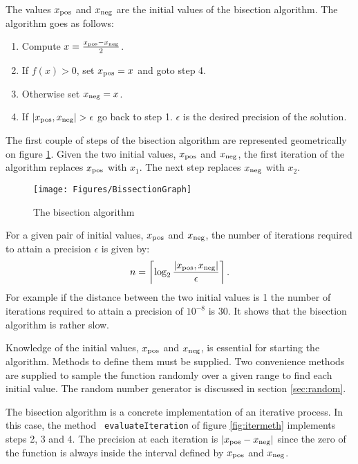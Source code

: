 \documentclass[twoside]{book}
\begin{document}
The values $x_{\mathop{\rm pos}}$ and $x_{\mathop{\rm neg}}$ are
the initial values of the bisection algorithm. The algorithm goes
as follows:
\begin{enumerate}
  \item Compute $x={x_{\mathop{\rm pos}}-x_{\mathop{\rm neg}}\over
  2}$.
  \item If $f\left(x\right)>0$, set $x_{\mathop{\rm pos}}=x$ and
  goto step 4.
  \item Otherwise set $x_{\mathop{\rm neg}}=x$.
  \item If $\left|
x_{\mathop{\rm pos}},x_{\mathop{\rm neg}}\right|>\epsilon$ go back
to step 1. $\epsilon$ is the desired precision of the solution.
\end{enumerate}
The first couple of steps of the bisection algorithm are
represented geometrically on figure \ref{fig:bisection}. Given the
two initial values, $x_{\mathop{\rm pos}}$ and $x_{\mathop{\rm
neg}}$, the first iteration of the algorithm replaces
$x_{\mathop{\rm pos}}$ with $x_1$. The next step replaces
$x_{\mathop{\rm neg}}$ with $x_2$.
\begin{figure}
\centering\texttt{[image: Figures/BissectionGraph]}
\caption{The bisection algorithm}\label{fig:bisection}
\end{figure}

For a given pair of initial values, $x_{\mathop{\rm pos}}$ and
$x_{\mathop{\rm neg}}$, the number of iterations required to
attain a precision $\epsilon$ is given by:
\begin{equation}
\label{eq:bissectime}
  n=\left\lceil\log_2{\displaystyle\left|
x_{\mathop{\rm pos}},x_{\mathop{\rm neg}}\right| \over
\displaystyle\epsilon}\right\rceil.
\end{equation}
For example if the distance between the two initial values is 1
the number of iterations required to attain a precision of
$10^{-8}$ is 30. It shows that the bisection algorithm is rather
slow.

Knowledge of the initial values, $x_{\mathop{\rm pos}}$ and
$x_{\mathop{\rm neg}}$, is essential for starting the algorithm.
Methods to define them must be supplied. Two convenience methods
are supplied to sample the function randomly over a given range to
find each initial value. The random number generator is discussed
in section \ref{sec:random}.

The bisection algorithm is a concrete implementation of an
iterative process. In this case, the method {\tt
evaluateIteration} of figure \ref{fig:itermeth} implements steps
2, 3 and 4. The precision at each iteration is $\left|
x_{\mathop{\rm pos}}-x_{\mathop{\rm neg}}\right|$ since the zero
of the function is always inside the interval defined by
$x_{\mathop{\rm pos}}$ and $x_{\mathop{\rm neg}}$.
\end{document}
